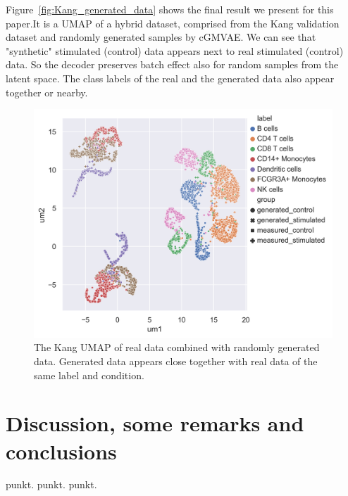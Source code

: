 \documentclass[11pt, a4paper]{report}
\theoremstyle{plain}
\theoremstyle{definition}
\theoremstyle{remark}
\begin{document}
Figure~\ref{fig:Kang_generated_data} shows the final result we present for this
paper.It is a UMAP of a hybrid dataset, comprised from the Kang validation
dataset and randomly generated samples by cGMVAE.
We can see that "synthetic" stimulated (control) data appears next to real
stimulated (control) data. So the decoder preserves batch effect also for
random samples from the latent space.
The class labels of the real and the generated data also appear together or
nearby.

\begin{figure}[h]
\centering
\includegraphics[width=1.15\textwidth]{images/Kang_generated_data_sns.png}
\caption{
The Kang UMAP of real data combined with randomly generated data.
Generated data appears close together with real data of the same label and
condition.
}
\label{fig:Kang_generated_data_sns}
\end{figure}





\chapter{Discussion, some remarks and conclusions}
punkt.
punkt.
punkt.


\end{document}
